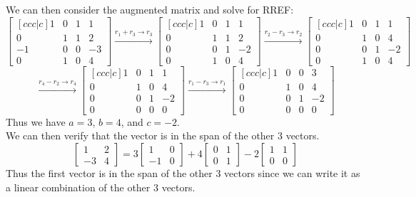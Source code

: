 \documentclass{article}
\begin{document}
We can then consider the augmented matrix and solve for RREF:
$$ \begin{bmatrix}[ccc|c]
    1 & 0 & 1 & 1\\
    0 & 1 & 1 & 2\\
    -1 & 0 & 0 & -3\\
    0 & 1 & 0 & 4
\end{bmatrix} \xrightarrow{r_1 + r_3 \rightarrow r_3} \begin{bmatrix}[ccc|c]
    1 & 0 & 1 & 1\\
    0 & 1 & 1 & 2\\
    0 & 0 & 1 & -2\\
    0 & 1 & 0 & 4
\end{bmatrix} \xrightarrow{r_2 - r_3 \rightarrow r_2} \begin{bmatrix}[ccc|c]
    1 & 0 & 1 & 1\\
    0 & 1 & 0 & 4\\
    0 & 0 & 1 & -2\\
    0 & 1 & 0 & 4
\end{bmatrix}$$
$$ \xrightarrow{r_4 - r_2 \rightarrow r_4} \begin{bmatrix}[ccc|c]
    1 & 0 & 1 & 1\\
    0 & 1 & 0 & 4\\
    0 & 0 & 1 & -2\\
    0 & 0 & 0 & 0
\end{bmatrix} \xrightarrow{r_1 - r_3 \rightarrow r_1} \begin{bmatrix}[ccc|c]
    1 & 0 & 0 & 3\\
    0 & 1 & 0 & 4\\
    0 & 0 & 1 & -2\\
    0 & 0 & 0 & 0
\end{bmatrix}$$
Thus we have $a = 3$, $b = 4$, and $c = -2$.\\
We can then verify that the vector is in the span of the other 3 vectors.\\ 
$$ \begin{bmatrix}
    1 & 2 \\
    -3 & 4
\end{bmatrix} = 3\begin{bmatrix}
    1 & 0 \\
    -1 & 0
\end{bmatrix} + 4\begin{bmatrix}
    0 & 1 \\
    0 & 1
\end{bmatrix} - 2\begin{bmatrix}
    1 & 1 \\
    0 & 0
\end{bmatrix} $$
Thus the first vector is in the span of the other 3 vectors since we can write it as a linear combination of the other 3 vectors.
\end{document}

